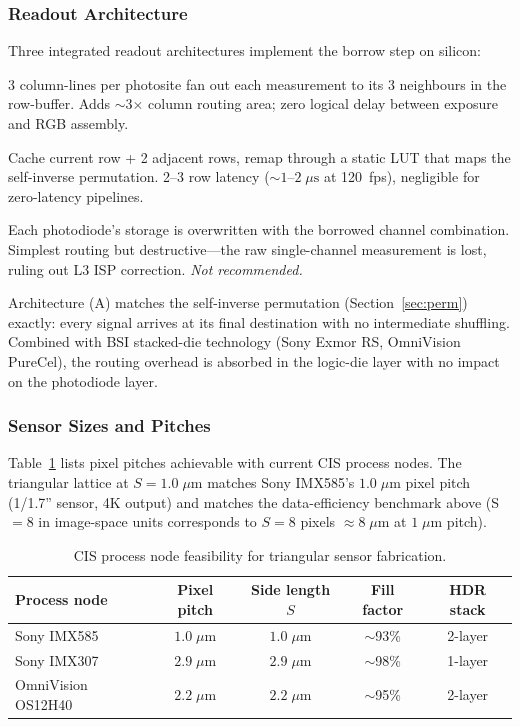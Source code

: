 \documentclass[10pt,twocolumn,letterpaper]{article}
\begin{document}
\subsubsection*{Readout Architecture}
Three integrated readout architectures implement the borrow step on silicon:
\begin{description}[nosep]
\item[Signal routing.] 3 column-lines per photosite fan out each measurement to its 3 neighbours in the row-buffer. Adds $\sim$3$\times$ column routing area; zero logical delay between exposure and RGB assembly.
\item[Row-buffer + LUT.] Cache current row + 2 adjacent rows, remap through a static LUT that maps the self-inverse permutation. 2--3 row latency ($\sim\!1$--$\!2\;\mu\mathrm{s}$ at 120~fps), negligible for zero-latency pipelines.
\item[In-pixel copy.] Each photodiode's storage is overwritten with the borrowed channel combination. Simplest routing but destructive---the raw single-channel measurement is lost, ruling out L3 ISP correction. \emph{Not recommended.}
\end{description}
Architecture (A) matches the self-inverse permutation (Section~\ref{sec:perm}) exactly: every signal arrives at its final destination with no intermediate shuffling. Combined with BSI stacked-die technology (Sony Exmor RS, OmniVision PureCel), the routing overhead is absorbed in the logic-die layer with no impact on the photodiode layer.

\subsubsection*{Sensor Sizes and Pitches}
Table~\ref{tab:fab} lists pixel pitches achievable with current CIS process nodes. The triangular lattice at $S = 1.0\;\mu\mathrm{m}$ matches Sony IMX585's $1.0\;\mu\mathrm{m}$ pixel pitch (1/1.7'' sensor, 4K output) and matches the data-efficiency benchmark above (S$ = 8$ in image-space units corresponds to $S = 8$ pixels $\approx 8\;\mu\mathrm{m}$ at $1\;\mu\mathrm{m}$ pitch).

\begin{table}[t]
\centering
\caption{CIS process node feasibility for triangular sensor fabrication.}
\label{tab:fab}
\begin{tabular}{lcccc}
\toprule
Process node & Pixel pitch & Side length $S$ & Fill factor & HDR stack \\
\midrule
Sony IMX585 & $1.0\;\mu\mathrm{m}$ & $1.0\;\mu\mathrm{m}$ & $\sim$93\% & 2-layer \\
Sony IMX307 & $2.9\;\mu\mathrm{m}$ & $2.9\;\mu\mathrm{m}$ & $\sim$98\% & 1-layer \\
OmniVision OS12H40 & $2.2\;\mu\mathrm{m}$ & $2.2\;\mu\mathrm{m}$ & $\sim$95\% & 2-layer \\
\bottomrule
\end{tabular}
\end{table}
\end{document}

